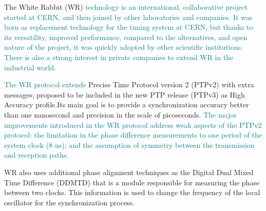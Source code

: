 The White Rabbit (WR)  \textcolor{teal}{technology is an international, collaborative project started at CERN, and then joined by other laboratories and companies. It was born as replacement technology for the timing system at CERN, but thanks to its versatility, improved performance, compared to the alternatives, and open nature of the project, it was quickly adopted by other scientific institutions. There is also a strong interest in private companies to extend WR in the  industrial world. }


\textcolor{teal}{The WR protocol}   \textcolor{teal}{extends} Precise Time Protocol version 2 (PTPv2) with extra messages, proposed to be included in the new PTP release (PTPv3) as High Accuracy profile.Its main goal is to provide a  synchronization  accuracy better than one nanosecond and  precision in the scale of picoseconds. \textcolor{teal}{The major improvements introduced in the WR protocol address weak aspects of the PTPv2 protocol: the limitation in the phase difference measurements to one period of the system clock (8 ns); and the assumption of symmetry between the transmission and reception paths.}


WR also uses additional phase alignment techniques as the Digital Dual Mixed Time Difference (DDMTD) that is a module responsible for measuring the phase between two clocks. This information is used to change the frequency of the local oscillator for the synchronization process.


